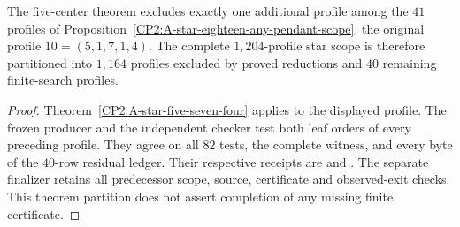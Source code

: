 \begin{proposition}
\label{CP2:A-star-eighteen-five-center-four-scope}
The five-center theorem excludes exactly one additional
profile among the $41$ profiles of
Proposition~\ref{CP2:A-star-eighteen-any-pendant-scope}:
the original profile $10=(5,1,7,1,4)$.  The complete
$1,204$-profile star scope is therefore partitioned into
$1,164$ profiles excluded by proved reductions and
$40$ remaining finite-search profiles.
\end{proposition}
\begin{proof}
Theorem~\ref{CP2:A-star-five-seven-four} applies to the
displayed profile.  The frozen producer
and the independent checker
test both leaf orders of every preceding profile.  They
agree on all $82$ tests, the complete witness, and every
byte of the $40$-row residual ledger.  Their respective
receipts are
and
.
The separate finalizer
retains all predecessor scope, source, certificate and
observed-exit checks.  This theorem partition does not
assert completion of any missing finite certificate.
\end{proof}
